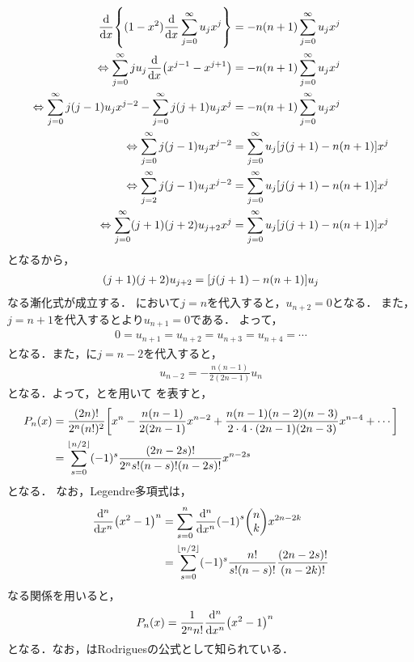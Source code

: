 \documentclass{report}
\begin{document}
    \begin{align}
      \dv{x}\qty{(1 - x^2)\dv{x}\sum_{j = 0}^{\infty}u_jx^j} &= -n(n + 1)\sum_{j = 0}^{\infty}u_jx^j \\ 
      \Leftrightarrow \sum_{j = 0}^{\infty}ju_j\dv{x}\qty(x^{j - 1} - x^{j + 1}) &= -n(n + 1)\sum_{j = 0}^{\infty}u_jx^j \\ 
      \Leftrightarrow \sum_{j = 0}^{\infty}j(j - 1)u_jx^{j - 2} - \sum_{j = 0}^{\infty}j(j + 1)u_jx^j &= -n(n + 1)\sum_{j = 0}^{\infty}u_jx^j \\ 
      \Leftrightarrow \sum_{j = 0}^{\infty}j(j - 1)u_jx^{j - 2} &= \sum_{j = 0}^{\infty}u_j\qty[j(j + 1) - n(n + 1)]x^j \\ 
      \Leftrightarrow \sum_{j = 2}^{\infty}j(j - 1)u_jx^{j - 2} &= \sum_{j = 0}^{\infty}u_j\qty[j(j + 1) - n(n + 1)]x^j \\ 
      \Leftrightarrow \sum_{j = 0}^{\infty}(j + 1)(j + 2)u_{j + 2}x^{j} &= \sum_{j = 0}^{\infty}u_j\qty[j(j + 1) - n(n + 1)]x^j 
    \end{align}
    となるから，
    \begin{align}
      (j + 1)(j + 2)u_{j + 2} = \qty[j(j + 1) - n(n + 1)]u_j\label{legendre-polynominal-u-expantion-recurr}
    \end{align}
    なる漸化式が成立する．
    において$j = n$を代入すると，$u_{n + 2} = 0$となる．
    また，$j = n + 1$を代入するとより$u_{n + 1} = 0$である．
    よって，
    \begin{align}
      0 = u_{n + 1} = u_{n + 2} = u_{n + 3} = u_{n + 4} = \cdots 
    \end{align}
    となる．また，に$j = n - 2$を代入すると，
    \begin{align}
      u_{n - 2} = -\frac{n(n - 1)}{2(2n - 1)}u_n\label{legendre-polynominal-u-expantion-recurr-2}
    \end{align}
    となる．よって，とを用いて
    を表すと，
    \begin{align}
      P_n(x) &= \frac{(2n)!}{2^n(n!)^2}\qty[x^n - \frac{n(n - 1)}{2(2n - 1)}x^{n - 2} + \frac{n(n - 1)(n - 2)(n - 3)}{2\cdot 4\cdot (2n - 1)(2n - 3)}x^{n - 4} + \cdots] \\ 
      &= \sum_{s = 0}^{\lfloor n/2 \rfloor}(-1)^s \frac{(2n - 2s)!}{2^ns!(n - s)!(n - 2s)!}x^{n - 2s}
    \end{align}
    となる．
    なお，Legendre多項式は，
    \begin{align}
      \dv[n]{x}\qty(x^2 - 1)^n &= \sum_{s = 0}^{n}\dv[n]{x}(-1)^s\mqty(n \\ k)x^{2n - 2k} \\ 
      &= \sum_{s = 0}^{\lfloor n/2 \rfloor}(-1)^s\frac{n!}{s!(n - s)!}\frac{(2n - 2s)!}{(n - 2k)!}
    \end{align}
    なる関係を用いると，
    \begin{align}
      P_n(x) &= \frac{1}{2^nn!}\dv[n]{x}\qty(x^2 - 1)^n\label{legendre-pn-easy}
    \end{align}
    となる．なお，はRodriguesの公式として知られている．
\end{document}
